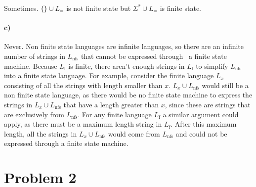 \documentclass[12pt]{article}
\begin{document}
Sometimes. \(\{\} \cup L_=\) is not finite state but \(\Sigma^* \cup L_=\) is finite state.

\paragraph{c)}

Never. Non finite state languages are infinite languages, so there are an infinite number of strings in \(L_\text{nfs}\) that cannot be expressed through \
a finite state machine. Because \(L_\text{f}\) is finite, there aren't enough strings in \(L_\text{f}\) to simplify \(L_\text{nfs}\) into a finite state language.
For example, consider the finite language \(L_x\) consisting of all the strings with length smaller than \(x\).
\(L_x \cup L_\text{nfs}\) would still be a non finite state language, as there would be no finite state machine to express the strings in \(L_x \cup L_\text{nfs}\)
that have a length greater than \(x\), since these are strings
that are exclusively from \(L_\text{nfs}\). For any finite language \(L_\text{f}\) a similar argument could apply, as there must be a maximum length string in
\(L_\text{f}\). After this maximum length, all the strings in \(L_x \cup L_\text{nfs}\) would come from \(L_\text{nfs}\) and could not be expressed through a
finite state machine.

\section*{Problem 2}
\end{document}
